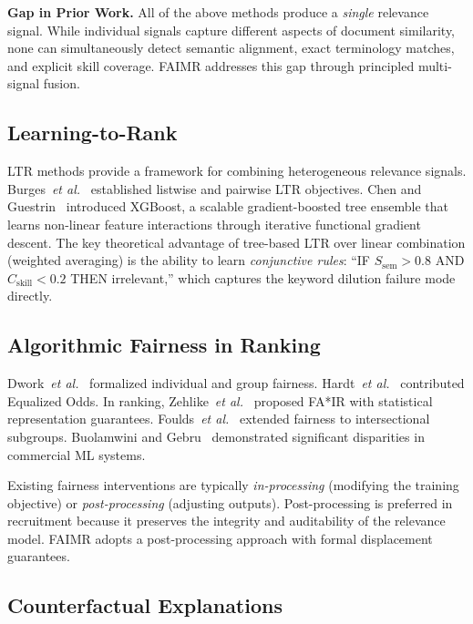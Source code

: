 \documentclass{llncs}
\begin{document}
\textbf{Gap in Prior Work.} All of the above methods produce a \textit{single} relevance signal. While individual signals capture different aspects of document similarity, none can simultaneously detect semantic alignment, exact terminology matches, and explicit skill coverage. FAIMR addresses this gap through principled multi-signal fusion.

\subsection{Learning-to-Rank}

LTR methods provide a framework for combining heterogeneous relevance signals. Burges~\textit{et al.}~\cite{burges2005learning} established listwise and pairwise LTR objectives. Chen and Guestrin~\cite{chen2016xgboost} introduced XGBoost, a scalable gradient-boosted tree ensemble that learns non-linear feature interactions through iterative functional gradient descent. The key theoretical advantage of tree-based LTR over linear combination (weighted averaging) is the ability to learn \textit{conjunctive rules}: ``IF $S_\text{sem} > 0.8$ AND $C_\text{skill} < 0.2$ THEN irrelevant,'' which captures the keyword dilution failure mode directly.

\subsection{Algorithmic Fairness in Ranking}

Dwork~\textit{et al.}~\cite{dwork2012fairness} formalized individual and group fairness. Hardt~\textit{et al.}~\cite{hardt2016equality} contributed Equalized Odds. In ranking, Zehlike~\textit{et al.}~\cite{zehlike2017fa} proposed FA*IR with statistical representation guarantees. Foulds~\textit{et al.}~\cite{foulds2020intersectional} extended fairness to intersectional subgroups. Buolamwini and Gebru~\cite{buolamwini2018gender} demonstrated significant disparities in commercial ML systems.

Existing fairness interventions are typically \textit{in-processing} (modifying the training objective) or \textit{post-processing} (adjusting outputs). Post-processing is preferred in recruitment because it preserves the integrity and auditability of the relevance model. FAIMR adopts a post-processing approach with formal displacement guarantees.

\subsection{Counterfactual Explanations}
\end{document}
